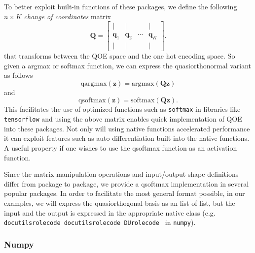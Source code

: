 \documentclass[]{article}
\providecommand*{\DUrole}[2]{%
  \ifcsname docutilsrole#1\endcsname%
    \csname docutilsrole#1\endcsname{#2}%
  \else
    \csname DUrole#1\endcsname{#2}%
  \fi%
}
\begin{document}
To better exploit built-in functions of these packages, we define the following $n\times K$ \emph{change of coordinates} matrix\begin{equation*}
\mathbf{Q}=  \left[\begin{matrix}
\bigg| & \bigg| & &\bigg | \\
\mathbf{q}_1 & \mathbf{q}_2 & \cdots & \mathbf{q}_K \\
\bigg| & \bigg| & &\bigg | \end{matrix}\right].
\end{equation*}that transforms between the QOE space and the one hot encoding space. So
given a argmax or softmax function, we can express the quasiorthonormal
variant as follows\begin{equation*}
\mathrm{qargmax}(\mathbf{z}) = \mathrm{argmax}(\mathbf{Qz})
\end{equation*}and\begin{equation}
\label{eq:convert}
\mathrm{qsoftmax}(\mathbf{z}) = \mathrm{softmax}(\mathbf{Qz}).
\end{equation}This facilitates the use of optimized functions such as \texttt{softmax} in libraries
like \texttt{tensorflow} and using the above matrix enables quick
implementation of QOE into these packages. Not only will using native functions accelerated performance it can exploit features such as auto differentiation built into the native functions. A useful property if one wishes to use the qsoftmax function as an activation function.

Since the matrix manipulation operations and input/output shape definitions differ from package to package, we provide a qsoftmax implementation in several popular packages. In order to facilitate the most general format possible, in our examples, we will express the quasiorthogonal basis as an list of list, but the input and the output is expressed in the appropriate native class (e.g. \texttt{\DUrole{code}{numpy.ndarray}} in \texttt{numpy}).

\subsubsection{Numpy%
  \label{numpy}%
}
\end{document}
